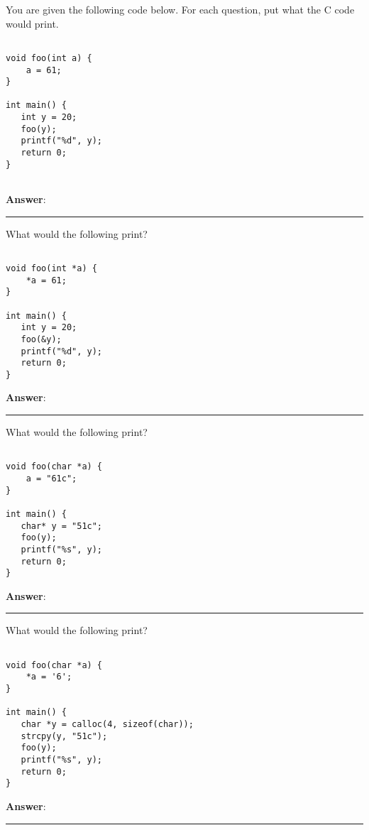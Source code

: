 \question You are given the following code below. For each question, put what the C code would print.

\begin{blocksection}

\begin{verbatim}

void foo(int a) {
    a = 61;
}

int main() {
   int y = 20;
   foo(y);
   printf("%d", y);
   return 0;
}


\end{verbatim}

\end{blocksection}
\textbf{Answer}: \rule{1cm}{0.25mm}


\question What would the following print?

\begin{blocksection}

\begin{verbatim}

void foo(int *a) {
    *a = 61;
}

int main() {
   int y = 20;
   foo(&y);
   printf("%d", y);
   return 0;
}

\end{verbatim}

\end{blocksection}
\textbf{Answer}: \rule{1cm}{0.25mm}

\pagebreak
\question What would the following print?

\begin{blocksection}

\begin{verbatim}

void foo(char *a) {
    a = "61c";
}

int main() {
   char* y = "51c";
   foo(y);
   printf("%s", y);
   return 0;
}

\end{verbatim}

\end{blocksection}
\textbf{Answer}: \rule{1cm}{0.25mm}


\question What would the following print?

\begin{blocksection}

\begin{verbatim}

void foo(char *a) {
    *a = '6';
}

int main() {
   char *y = calloc(4, sizeof(char));
   strcpy(y, "51c");
   foo(y);
   printf("%s", y);
   return 0;
}

\end{verbatim}

\end{blocksection}
\textbf{Answer}: \rule{1cm}{0.25mm}

